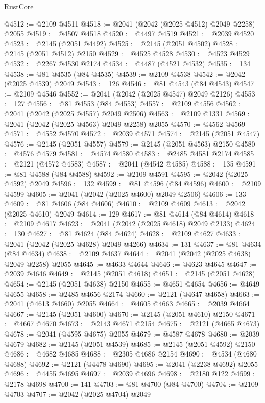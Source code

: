 \begin{lexlean}{RustCore}
\begin{coremodule}
@4512 := @2109 @4511
@4518 := @2041 (@2042 (@2025 @4512) @2049 @2258) @2055
@4519 := @4507 @4518
@4520 := @4497 @4519
@4521 := @2039 @4520
@4523 := @2145 (@2051 @4492)
@4525 := @2145 (@2051 @4502)
@4528 := @2145 (@2051 @4512) @2150
@4529 := @4525 @4528
@4530 := @4523 @4529
@4532 := @2267 @4530 @2174
@4534 := @4487 (@4521 @4532)
@4535 := 134
@4538 := @81 @4535 (@84 @4535)
@4539 := @2109 @4538
@4542 := @2042 (@2025 @4539) @2049
@4543 := 126
@4546 := @81 @4543 (@84 @4543)
@4547 := @2109 @4546
@4552 := @2041 (@2042 (@2025 @4547) @2049 @2126)
@4553 := 127
@4556 := @81 @4553 (@84 @4553)
@4557 := @2109 @4556
@4562 := @2041 (@2042 (@2025 @4557) @2049 @2506)
@4563 := @2109 @1331
@4569 := @2041 (@2042 (@2025 @4563) @2049 @2258) @2055
@4570 := @4562 @4569
@4571 := @4552 @4570
@4572 := @2039 @4571
@4574 := @2145 (@2051 @4547)
@4576 := @2145 (@2051 @4557)
@4579 := @2145 (@2051 @4563) @2150
@4580 := @4576 @4579
@4581 := @4574 @4580
@4583 := @2485 @4581 @2174
@4585 := @2121 (@4572 @4583)
@4587 := @2041 (@4542 @4585)
@4588 := 135
@4591 := @81 @4588 (@84 @4588)
@4592 := @2109 @4591
@4595 := @2042 (@2025 @4592) @2049
@4596 := 132
@4599 := @81 @4596 (@84 @4596)
@4600 := @2109 @4599
@4605 := @2041 (@2042 (@2025 @4600) @2049 @2506)
@4606 := 133
@4609 := @81 @4606 (@84 @4606)
@4610 := @2109 @4609
@4613 := @2042 (@2025 @4610) @2049
@4614 := 129
@4617 := @81 @4614 (@84 @4614)
@4618 := @2109 @4617
@4623 := @2041 (@2042 (@2025 @4618) @2049 @2133)
@4624 := 130
@4627 := @81 @4624 (@84 @4624)
@4628 := @2109 @4627
@4633 := @2041 (@2042 (@2025 @4628) @2049 @4266)
@4634 := 131
@4637 := @81 @4634 (@84 @4634)
@4638 := @2109 @4637
@4644 := @2041 (@2042 (@2025 @4638) @2049 @2258) @2055
@4645 := @4633 @4644
@4646 := @4623 @4645
@4647 := @2039 @4646
@4649 := @2145 (@2051 @4618)
@4651 := @2145 (@2051 @4628)
@4654 := @2145 (@2051 @4638) @2150
@4655 := @4651 @4654
@4656 := @4649 @4655
@4658 := @2485 @4656 @2174
@4660 := @2121 (@4647 @4658)
@4663 := @2041 (@4613 @4660) @2055
@4664 := @4605 @4663
@4665 := @2039 @4664
@4667 := @2145 (@2051 @4600)
@4670 := @2145 (@2051 @4610) @2150
@4671 := @4667 @4670
@4673 := @2143 @4671 @2154
@4675 := @2121 (@4665 @4673)
@4678 := @2041 (@4595 @4675) @2055
@4679 := @4587 @4678
@4680 := @2039 @4679
@4682 := @2145 (@2051 @4539)
@4685 := @2145 (@2051 @4592) @2150
@4686 := @4682 @4685
@4688 := @2305 @4686 @2154
@4690 := @4534 (@4680 @4688)
@4692 := @2121 (@4478 @4690)
@4695 := @2041 (@2238 @4692) @2055
@4696 := @4455 @4695
@4697 := @2039 @4696
@4698 := @2180 @122
@4699 := @2178 @4698
@4700 := 141
@4703 := @81 @4700 (@84 @4700)
@4704 := @2109 @4703
@4707 := @2042 (@2025 @4704) @2049

\end{coremodule}
\end{lexlean}
